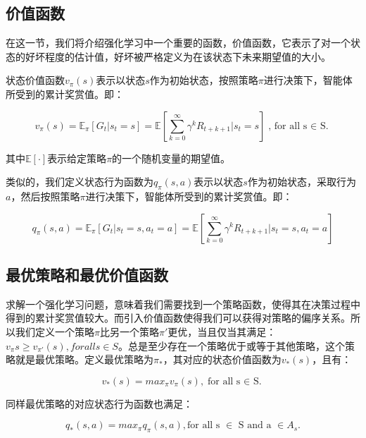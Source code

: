 \documentclass{standalone}
\begin{document}
\subsection{价值函数}
在这一节，我们将介绍强化学习中一个重要的函数，价值函数，它表示了对一个状态的好坏程度的估计值，好坏被严格定义为在该状态下未来期望值的大小。\par
状态价值函数$v_{\pi}(s)$表示以状态$s$作为初始状态，按照策略$\pi$进行决策下，智能体所受到的累计奖赏值。即：
\begin{center}
    \begin{equation}
        v_{\pi}(s) = \mathbb{E}_{\pi}[G_t|s_t=s] = \mathbb{E}[\sum_{k=0}^{\infty}{\gamma^k{R_{t+k+1}}}|s_t=s]
        \mbox{, for all s $\in$ S.}
    \end{equation}
\end{center}
其中$\mathbb{E[\cdot]}$表示给定策略$\pi$的一个随机变量的期望值。
\par
类似的，我们定义状态行为函数为$q_{\pi}(s,a)$表示以状态$s$作为初始状态，采取行为$a$，然后按照策略$\pi$进行决策下，智能体所受到的累计奖赏值。即：
\begin{center}
    \begin{equation}
        q_{\pi}(s,a) = \mathbb{E}_{\pi}[G_t|s_t=s, a_t=a] = \mathbb{E}[\sum_{k=0}^{\infty}{\gamma^k{R_{t+k+1}}}|s_t=s, a_t=a]
    \end{equation}
    
\end{center}
\subsection{最优策略和最优价值函数}
求解一个强化学习问题，意味着我们需要找到一个策略函数，使得其在决策过程中得到的累计奖赏值较大。而引入价值函数使得我们可以获得对策略的偏序关系。所以我们定义一个策略$\pi$比另一个策略$\pi'$更优，当且仅当其满足：$v_{\pi}{}s \geq v_{\pi'}(s), for all s \in S$。总是至少存在一个策略优于或等于其他策略，这个策略就是最优策略。定义最优策略为$\pi_{*}$，其对应的状态价值函数为$v_{*}(s)$，且有：
\begin{center}
    \begin{equation}
        v_{*}(s) = max_{\pi}v_{\pi}(s),
        \mbox{for all s $\in$ S.}
    \end{equation}
\end{center}
同样最优策略的对应状态行为函数也满足：
\begin{center}
    \begin{equation}
        q_{*}(s, a) = max_{\pi}q_{\pi}(s, a),
        \mbox{for all s $\in$ S and a $\in A_s$.}
    \end{equation}
\end{center}
\end{document}
